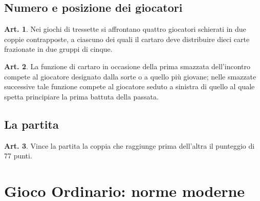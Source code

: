 \documentclass[italian,a4paper]{book}
\theoremstyle{definition}
\newtheorem{art}{Art.}
\begin{document}
\subsection{Numero e posizione dei giocatori}
\begin{art}
Nei giochi di tressette si affrontano quattro giocatori schierati in due
coppie contrapposte, a ciascuno dei quali il cartaro deve distribuire dieci carte frazionate in due gruppi di cinque.
\end{art}
\begin{art}
La funzione di cartaro in occasione della prima smazzata dell'incontro compete al giocatore designato dalla sorte o a quello più giovane; nelle smazzate successive tale funzione compete al giocatore seduto a sinistra di quello al quale spetta principiare la prima battuta della passata.
\end{art}
\subsection{La partita}
\begin{art}
Vince la partita la coppia che raggiunge prima dell'altra il punteggio di 77
punti.
\end{art}
\section{Gioco Ordinario: norme moderne}
\end{document}
